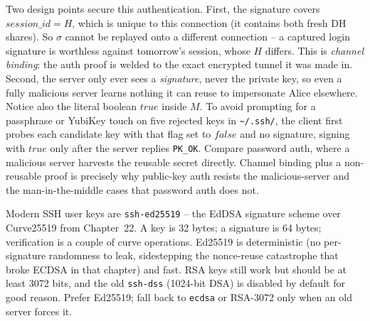 \begin{whybox}
Two design points secure this authentication. First, the signature covers $\textit{session\_id} = H$, which is unique to this connection (it contains both fresh DH shares). So $\sigma$ cannot be replayed onto a different connection -- a captured login signature is worthless against tomorrow's session, whose $H$ differs. This is \emph{channel binding}: the auth proof is welded to the exact encrypted tunnel it was made in. Second, the server only ever sees a \emph{signature}, never the private key, so even a fully malicious server learns nothing it can reuse to impersonate Alice elsewhere. Notice also the literal boolean $\textit{true}$ inside $M$. To avoid prompting for a passphrase or YubiKey touch on five rejected keys in \texttt{\textasciitilde/.ssh/}, the client first probes each candidate key with that flag set to $\textit{false}$ and no signature, signing with $\textit{true}$ only after the server replies \texttt{PK\_OK}. Compare password auth, where a malicious server harvests the reusable secret directly. Channel binding plus a non-reusable proof is precisely why public-key auth resists the malicious-server and the man-in-the-middle cases that password auth does not.
\end{whybox}

\begin{connectionbox}
Modern SSH user keys are \texttt{ssh-ed25519} -- the EdDSA signature scheme over Curve25519 from Chapter~22. A key is 32 bytes; a signature is 64 bytes; verification is a couple of curve operations. Ed25519 is deterministic (no per-signature randomness to leak, sidestepping the nonce-reuse catastrophe that broke ECDSA in that chapter) and fast. RSA keys still work but should be at least 3072 bits, and the old \texttt{ssh-dss} (1024-bit DSA) is disabled by default for good reason. Prefer Ed25519; fall back to \texttt{ecdsa} or RSA-3072 only when an old server forces it.
\end{connectionbox}

